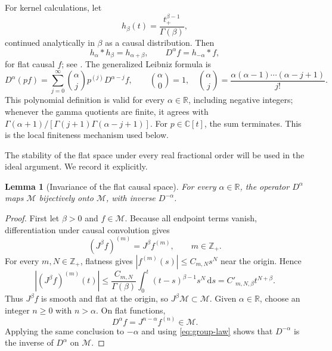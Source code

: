 \documentclass[11pt]{article}
\numberwithin{equation}{section}
\newtheorem{lemma}{Lemma}
\theoremstyle{definition}
\theoremstyle{remark}
\newcommand{\C}{\mathbb C}
\newcommand{\R}{\mathbb R}
\newcommand{\Z}{\mathbb Z}
\newcommand{\M}{\mathcal M}
\newcommand{\dd}{\,\mathrm d}
\begin{document}
For kernel calculations, let
\begin{equation*}
h_\beta(t)=\frac{t_+^{\beta-1}}{\Gamma(\beta)},
\end{equation*}
continued analytically in $\beta$ as a causal distribution. Then
\begin{equation*}
h_\alpha*h_\beta=h_{\alpha+\beta},
\qquad D^\alpha f=h_{-\alpha}*f,
\end{equation*}
for flat causal $f$; see \cite{Gelfand1964}. The generalized Leibniz formula is
\begin{equation}
D^\alpha(pf)=\sum_{j=0}^{\infty}\binom{\alpha}{j}p^{(j)}D^{\alpha-j}f,
\qquad
\binom{\alpha}{0}=1,
\quad
\binom{\alpha}{j}=\frac{\alpha(\alpha-1)\cdots(\alpha-j+1)}{j!}.
\label{eq:leibniz}
\end{equation}
This polynomial definition is valid for every $\alpha\in\R$, including negative integers; whenever the gamma quotients are finite, it agrees with $\Gamma(\alpha+1)/[\Gamma(j+1)\Gamma(\alpha-j+1)]$. For $p\in\C[t]$, the sum terminates. This is the local finiteness mechanism used below.

The stability of the flat space under every real fractional order will be used in the ideal argument. We record it explicitly.

\begin{lemma}[Invariance of the flat causal space]\label{lem:flat-invariance}
For every $\alpha\in\R$, the operator $D^\alpha$ maps $\M$ bijectively onto $\M$, with inverse $D^{-\alpha}$.
\end{lemma}

\begin{proof}
First let $\beta>0$ and $f\in\M$. Because all endpoint terms vanish, differentiation under causal convolution gives
\begin{equation*}
(J^\beta f)^{(m)}=J^\beta f^{(m)},
\qquad m\in\Z_+.
\end{equation*}
For every $m,N\in\Z_+$, flatness gives $|f^{(m)}(s)|\le C_{m,N}s^N$ near the origin. Hence
\begin{equation*}
|(J^\beta f)^{(m)}(t)|
\le \frac{C_{m,N}}{\Gamma(\beta)}\int_0^t(t-s)^{\beta-1}s^N\dd s
=C'_{m,N,\beta}t^{N+\beta}.
\end{equation*}
Thus $J^\beta f$ is smooth and flat at the origin, so $J^\beta\M\subset\M$. Given $\alpha\in\R$, choose an integer $n\ge0$ with $n>\alpha$. On flat functions,
\begin{equation*}
D^\alpha f=J^{n-\alpha}f^{(n)}\in\M.
\end{equation*}
Applying the same conclusion to $-\alpha$ and using \eqref{eq:group-law} shows that $D^{-\alpha}$ is the inverse of $D^\alpha$ on $\M$.
\end{proof}
\end{document}
